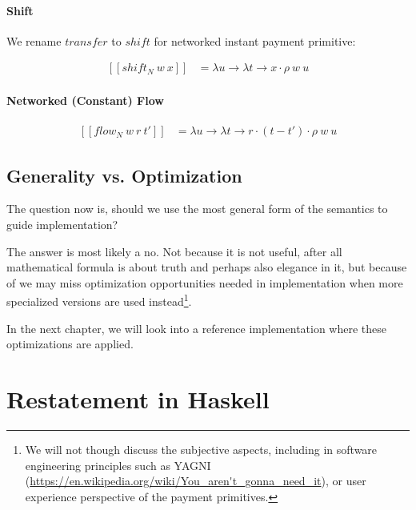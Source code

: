 \paragraph{Shift}

We rename $transfer$ to $shift$ for networked instant payment primitive:

\begin{equation}
    \begin{split}
        [\![shift_N\ w\ x]\!] &=
        \lambda u \rightarrow \lambda t \rightarrow x \cdot \rho\ w\ u
    \end{split}
\end{equation}

\paragraph{Networked (Constant) Flow}

\begin{equation}
    \begin{split}
        [\![flow_N\ w\ r\ t']\!] &=
        \lambda u \rightarrow \lambda t \rightarrow r \cdot (t - t') \cdot \rho\ w\ u
    \end{split}
\end{equation}

\subsection{Generality vs. Optimization}

The question now is, should we use the most general form of the semantics to guide implementation?

The answer is most likely a no. Not because it is not useful, after all mathematical formula is about truth and perhaps
also elegance in it, but because of we may miss optimization opportunities needed in implementation when more
specialized versions are used instead\footnote{We will not though discuss the subjective aspects, including in software
engineering principles such as YAGNI (\url{https://en.wikipedia.org/wiki/You_aren't_gonna_need_it}), or user experience
perspective of the payment primitives.}.

In the next chapter, we will look into a reference implementation where these optimizations are applied.

\section{Restatement in Haskell}

